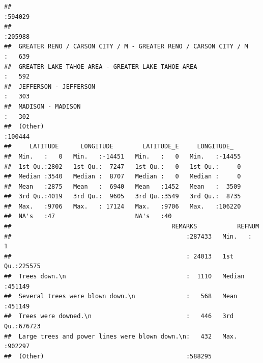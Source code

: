 \documentclass[]{article}
\begin{document}
\begin{verbatim}
##                                                                                                                                                                                                          :594029  
##                                                                                                                                                                                                          :205988  
##  GREATER RENO / CARSON CITY / M - GREATER RENO / CARSON CITY / M                                                                                                                                         :   639  
##  GREATER LAKE TAHOE AREA - GREATER LAKE TAHOE AREA                                                                                                                                                       :   592  
##  JEFFERSON - JEFFERSON                                                                                                                                                                                   :   303  
##  MADISON - MADISON                                                                                                                                                                                       :   302  
##  (Other)                                                                                                                                                                                                 :100444  
##     LATITUDE      LONGITUDE        LATITUDE_E     LONGITUDE_    
##  Min.   :   0   Min.   :-14451   Min.   :   0   Min.   :-14455  
##  1st Qu.:2802   1st Qu.:  7247   1st Qu.:   0   1st Qu.:     0  
##  Median :3540   Median :  8707   Median :   0   Median :     0  
##  Mean   :2875   Mean   :  6940   Mean   :1452   Mean   :  3509  
##  3rd Qu.:4019   3rd Qu.:  9605   3rd Qu.:3549   3rd Qu.:  8735  
##  Max.   :9706   Max.   : 17124   Max.   :9706   Max.   :106220  
##  NA's   :47                      NA's   :40                     
##                                            REMARKS           REFNUM      
##                                                :287433   Min.   :     1  
##                                                : 24013   1st Qu.:225575  
##  Trees down.\n                                 :  1110   Median :451149  
##  Several trees were blown down.\n              :   568   Mean   :451149  
##  Trees were downed.\n                          :   446   3rd Qu.:676723  
##  Large trees and power lines were blown down.\n:   432   Max.   :902297  
##  (Other)                                       :588295
\end{verbatim}
\end{document}
